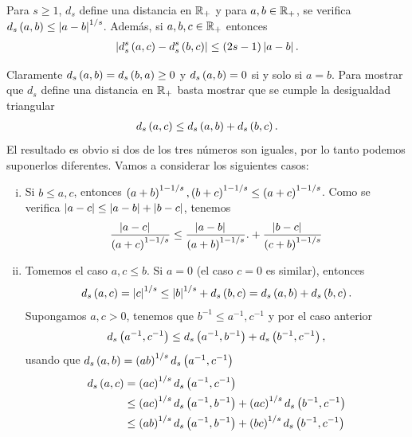 \begin{lemma}
	Para $s\ge 1$, $d_{s}$ define una distancia en $\mathbb{R}_{+}$ y para $a,b\in\mathbb{R}_{+}$, se verifica $d_{s}\left( a,b \right) \le \left| a-b \right|^{1/s}$.
	Además, si $a,b,c\in\mathbb{R}_{+}$ entonces
	\begin{align*}
	\left| d_{s}^{s}\left( a,c \right)-d_{s}^{s}\left( b,c \right) \right| \le \left( 2s-1 \right)\left| a-b \right|.
	\end{align*}
\end{lemma}

\begin{dem}
	Claramente $d_{s}\left( a,b \right) = d_{s}\left( b,a \right) \ge 0$ y $d_{s}\left( a,b \right) = 0$ si y solo si $a = b$.
	Para mostrar que $d_{s}$ define una distancia en $\mathbb{R}_{+}$ basta mostrar que se cumple la desigualdad triangular
	\begin{align*}
	d_{s}\left( a,c \right) \le d_{s}\left( a,b \right) + d_{s}\left( b,c \right).
	\end{align*}
	El resultado es obvio si dos de los tres números son iguales, por lo tanto podemos suponerlos diferentes. Vamos a considerar los siguientes casos:
	\begin{enumerate}[i)]
		\item Si $b \le a,c$, entonces $\left( a + b \right)^{1-1/s},\left( b + c \right)^{1-1/s} \le \left( a + c \right)^{1-1/s}$.
		Como se verifica $\left| a-c \right| \le \left| a-b \right| + \left| b-c \right|$, tenemos
		\begin{align*}
		\dfrac{\left| a - c \right|\ \ \ }{\left( a + c \right)^{1-1/s}} \le \dfrac{\left| a - b \right|\ \ \ }{\left( a + b \right)^{1-1/s}} .
		+ \dfrac{\left| b - c \right|\ \ \ }{\left( c + b \right)^{1-1/s}}
		\end{align*}
		\item Tomemos el caso $a,c \le b$. Si $a=0$ (el caso $c=0$ es similar), entonces 
		\begin{align*}
		d_{s}\left( a,c \right) = \left| c \right|^{1/s} \le \left| b \right|^{1/s} + d_{s}\left( b,c \right) = d_{s}\left( a,b \right) + d_{s}\left( b,c \right).
		\end{align*}
		Supongamos $a,c>0$, tenemos que $b^{-1} \le a^{-1},c^{-1}$ y por el caso anterior
		\begin{align*}
		d_{s}\left( a^{-1},c^{-1} \right) \le d_{s}\left( a^{-1},b^{-1} \right) + d_{s}\left( b^{-1},c^{-1} \right),
		\end{align*}
		usando que $d_{s}\left( a,b \right) = \left( a b \right)^{1/s}d_{s}\left( a^{-1},c^{-1} \right)$
		\begin{align*}
		d_{s}\pa{a,c} & = \pa{a c}^{1/s} d_{s}\pa{a^{-1},c^{-1}} \\
		& \le \pa{a c}^{1/s} d_{s}\pa{a^{-1},b^{-1}} + \pa{a c}^{1/s} d_{s}\pa{b^{-1},c^{-1}} \\
		& \le \pa{a b}^{1/s} d_{s}\pa{a^{-1},b^{-1}} + \pa{b c}^{1/s} d_{s}\pa{b^{-1},c^{-1}} \\

\end{align*}
\end{enumerate}
\end{dem}
